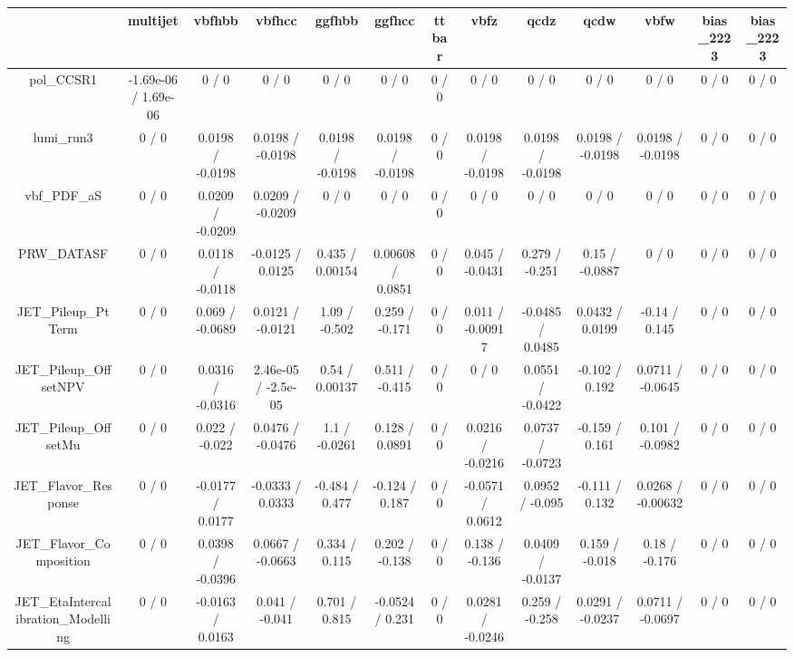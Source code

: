 \documentclass[10pt]{article}
\begin{document}
\begin{table}[htbp]
\begin{center}
\begin{tabular}{|c|c|c|c|c|c|c|c|c|c|c|c|c|}
\hline 
      & multijet      & vbfhbb      & vbfhcc      & ggfhbb      & ggfhcc      & ttbar      & vbfz      & qcdz      & qcdw      & vbfw      & bias_2223      & bias_2223 \\ 
\hline 
  pol_CCSR1 & -1.69e-06 / 1.69e-06 & 0 / 0 & 0 / 0 & 0 / 0 & 0 / 0 & 0 / 0 & 0 / 0 & 0 / 0 & 0 / 0 & 0 / 0 & 0 / 0 & 0 / 0 \\ 
  lumi_run3 & 0 / 0 & 0.0198 / -0.0198 & 0.0198 / -0.0198 & 0.0198 / -0.0198 & 0.0198 / -0.0198 & 0 / 0 & 0.0198 / -0.0198 & 0.0198 / -0.0198 & 0.0198 / -0.0198 & 0.0198 / -0.0198 & 0 / 0 & 0 / 0 \\ 
  vbf_PDF_aS & 0 / 0 & 0.0209 / -0.0209 & 0.0209 / -0.0209 & 0 / 0 & 0 / 0 & 0 / 0 & 0 / 0 & 0 / 0 & 0 / 0 & 0 / 0 & 0 / 0 & 0 / 0 \\ 
  PRW_DATASF & 0 / 0 & 0.0118 / -0.0118 & -0.0125 / 0.0125 & 0.435 / 0.00154 & 0.00608 / 0.0851 & 0 / 0 & 0.045 / -0.0431 & 0.279 / -0.251 & 0.15 / -0.0887 & 0 / 0 & 0 / 0 & 0 / 0 \\ 
  JET_Pileup_PtTerm & 0 / 0 & 0.069 / -0.0689 & 0.0121 / -0.0121 & 1.09 / -0.502 & 0.259 / -0.171 & 0 / 0 & 0.011 / -0.00917 & -0.0485 / 0.0485 & 0.0432 / 0.0199 & -0.14 / 0.145 & 0 / 0 & 0 / 0 \\ 
  JET_Pileup_OffsetNPV & 0 / 0 & 0.0316 / -0.0316 & 2.46e-05 / -2.5e-05 & 0.54 / 0.00137 & 0.511 / -0.415 & 0 / 0 & 0 / 0 & 0.0551 / -0.0422 & -0.102 / 0.192 & 0.0711 / -0.0645 & 0 / 0 & 0 / 0 \\ 
  JET_Pileup_OffsetMu & 0 / 0 & 0.022 / -0.022 & 0.0476 / -0.0476 & 1.1 / -0.0261 & 0.128 / 0.0891 & 0 / 0 & 0.0216 / -0.0216 & 0.0737 / -0.0723 & -0.159 / 0.161 & 0.101 / -0.0982 & 0 / 0 & 0 / 0 \\ 
  JET_Flavor_Response & 0 / 0 & -0.0177 / 0.0177 & -0.0333 / 0.0333 & -0.484 / 0.477 & -0.124 / 0.187 & 0 / 0 & -0.0571 / 0.0612 & 0.0952 / -0.095 & -0.111 / 0.132 & 0.0268 / -0.00632 & 0 / 0 & 0 / 0 \\ 
  JET_Flavor_Composition & 0 / 0 & 0.0398 / -0.0396 & 0.0667 / -0.0663 & 0.334 / 0.115 & 0.202 / -0.138 & 0 / 0 & 0.138 / -0.136 & 0.0409 / -0.0137 & 0.159 / -0.018 & 0.18 / -0.176 & 0 / 0 & 0 / 0 \\ 
  JET_EtaIntercalibration_Modelling & 0 / 0 & -0.0163 / 0.0163 & 0.041 / -0.041 & 0.701 / 0.815 & -0.0524 / 0.231 & 0 / 0 & 0.0281 / -0.0246 & 0.259 / -0.258 & 0.0291 / -0.0237 & 0.0711 / -0.0697 & 0 / 0 & 0 / 0 \\ 

\end{tabular}
\end{center}
\end{table}
\end{document}
